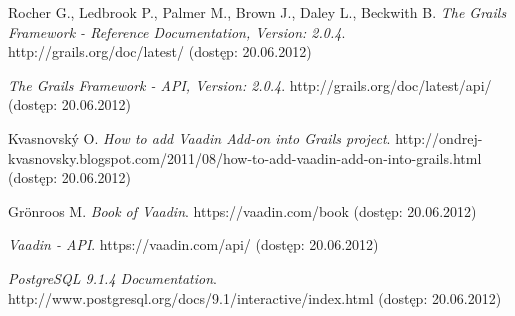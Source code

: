 \begin{thebibliography}{99}

  Rocher G., Ledbrook P., Palmer M., Brown J., Daley L., Beckwith B.
  \emph{The Grails Framework - Reference Documentation, 
  Version: 2.0.4}.
  http://grails.org/doc/latest/
  \newblock (dostęp: 20.06.2012)

  \emph{The Grails Framework - API, 
  Version: 2.0.4}.
  http://grails.org/doc/latest/api/
  \newblock (dostęp: 20.06.2012)

  Kvasnovský O.
  \emph{How to add Vaadin Add-on into Grails project}.
  http://ondrej-kvasnovsky.blogspot.com/2011/08/how-to-add-vaadin-add-on-into-grails.html
  \newblock (dostęp: 20.06.2012)

  Grönroos M.
  \emph{Book of Vaadin}.
  https://vaadin.com/book
  \newblock (dostęp: 20.06.2012)

  \emph{Vaadin - API}.
  https://vaadin.com/api/
  \newblock (dostęp: 20.06.2012)

  \emph{PostgreSQL 9.1.4 Documentation}.
  http://www.postgresql.org/docs/9.1/interactive/index.html
  \newblock (dostęp: 20.06.2012)

\end{thebibliography}
